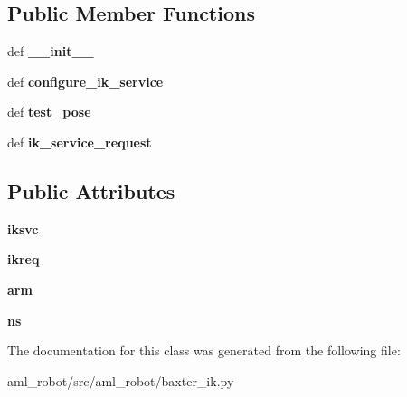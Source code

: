 \subsection*{Public Member Functions}
\begin{DoxyCompactItemize}
\item 
\hypertarget{classaml__robot_1_1baxter__ik_1_1_i_k_baxter_acdcbd683c692f89daec2685a9ec2e623}{def {\bfseries \-\_\-\-\_\-init\-\_\-\-\_\-}}\label{classaml__robot_1_1baxter__ik_1_1_i_k_baxter_acdcbd683c692f89daec2685a9ec2e623}

\item 
\hypertarget{classaml__robot_1_1baxter__ik_1_1_i_k_baxter_a6985adef358e80b1924292508a707a66}{def {\bfseries configure\-\_\-ik\-\_\-service}}\label{classaml__robot_1_1baxter__ik_1_1_i_k_baxter_a6985adef358e80b1924292508a707a66}

\item 
\hypertarget{classaml__robot_1_1baxter__ik_1_1_i_k_baxter_a87fb9334e61c8d42b4ff2c5e00402b98}{def {\bfseries test\-\_\-pose}}\label{classaml__robot_1_1baxter__ik_1_1_i_k_baxter_a87fb9334e61c8d42b4ff2c5e00402b98}

\item 
\hypertarget{classaml__robot_1_1baxter__ik_1_1_i_k_baxter_a57d1196752ec02667e697743cf4cc049}{def {\bfseries ik\-\_\-service\-\_\-request}}\label{classaml__robot_1_1baxter__ik_1_1_i_k_baxter_a57d1196752ec02667e697743cf4cc049}

\end{DoxyCompactItemize}
\subsection*{Public Attributes}
\begin{DoxyCompactItemize}
\item 
\hypertarget{classaml__robot_1_1baxter__ik_1_1_i_k_baxter_a8febd21258f15a3721ecdddd275c9bef}{{\bfseries iksvc}}\label{classaml__robot_1_1baxter__ik_1_1_i_k_baxter_a8febd21258f15a3721ecdddd275c9bef}

\item 
\hypertarget{classaml__robot_1_1baxter__ik_1_1_i_k_baxter_ac3a37bd5bdcafced7d11cff004d5a5da}{{\bfseries ikreq}}\label{classaml__robot_1_1baxter__ik_1_1_i_k_baxter_ac3a37bd5bdcafced7d11cff004d5a5da}

\item 
\hypertarget{classaml__robot_1_1baxter__ik_1_1_i_k_baxter_a31eb6a0623788ecb628c413f6c1cf85a}{{\bfseries arm}}\label{classaml__robot_1_1baxter__ik_1_1_i_k_baxter_a31eb6a0623788ecb628c413f6c1cf85a}

\item 
\hypertarget{classaml__robot_1_1baxter__ik_1_1_i_k_baxter_a006f01e493d58ff9db613d66baa07a63}{{\bfseries ns}}\label{classaml__robot_1_1baxter__ik_1_1_i_k_baxter_a006f01e493d58ff9db613d66baa07a63}

\end{DoxyCompactItemize}


The documentation for this class was generated from the following file\-:\begin{DoxyCompactItemize}
\item 
aml\-\_\-robot/src/aml\-\_\-robot/baxter\-\_\-ik.\-py\end{DoxyCompactItemize}

